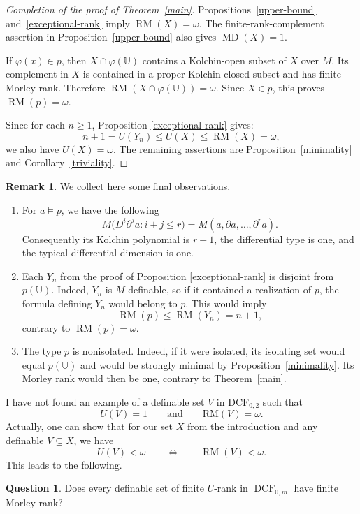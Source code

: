 \documentclass[11pt,a4paper]{amsart}
\theoremstyle{definition}
\newtheorem{remark}[theorem]{Remark}
\newtheorem{question}[theorem]{Question}
\newcommand{\DCF}{\operatorname{DCF}}
\newcommand{\RM}{\operatorname{RM}}
\newcommand{\MD}{\operatorname{MD}}
\newcommand{\Ucal}{{\mathds{U}}}
\begin{document}
\begin{proof}[Completion of the proof of Theorem~\ref{main}]
Propositions~\ref{upper-bound} and~\ref{exceptional-rank} imply
$\RM(X)=\omega$. The finite-rank-complement assertion in
Proposition~\ref{upper-bound} also gives $\MD(X)=1$.

If $\varphi(x)\in p$, then $X\cap\varphi(\Ucal)$ contains a
Kolchin-open subset of $X$ over $M$. Its complement in $X$ is contained
in a proper Kolchin-closed subset and has finite Morley rank.
Therefore $\RM(X\cap\varphi(\Ucal))=\omega$. Since $X\in p$,
this proves $\RM(p)=\omega$.

Since for each $n\geqslant1$, Proposition \ref{exceptional-rank} gives:
\[
n+1=U(Y_n)\leqslant U(X)\leqslant\RM(X)=\omega,
\]
we also have $U(X)=\omega$. The remaining assertions are Proposition~\ref{minimality} and
Corollary~\ref{triviality}.
\end{proof}

\begin{remark}
We collect here some final observations.
\begin{enumerate}
  \item For $a\models p$, we have the following
\[
 M\bigl(D^i\partial^j a:i+j\leqslant r\bigr)
   =M(a,\partial a,\ldots,\partial^r a).
\]
Consequently its Kolchin polynomial is $r+1$, the differential type is
one, and the typical differential dimension is one.

  \item Each $Y_n$ from the proof of Proposition \ref{exceptional-rank} is disjoint from $p(\Ucal)$. Indeed, $Y_n$ is
$M$-definable, so if it contained a realization of $p$,
the formula defining $Y_n$ would belong to $p$. This would
imply
\[
\RM(p)\leqslant\RM(Y_n)=n+1,
\]
contrary to $\RM(p)=\omega$.

  \item The type $p$ is nonisolated. Indeed, if it were isolated, its isolating
set would equal $p(\Ucal)$ and would be strongly minimal by
Proposition~\ref{minimality}. Its Morley rank would then be one,
contrary to Theorem~\ref{main}.
\end{enumerate}

\end{remark}
I have not found an example of a definable set $V$ in
$\mathrm{DCF}_{0,2}$ such that
\[
U(V)=1
\qquad\text{and}\qquad
\mathrm{RM}(V)=\omega.
\]
Actually, one can show that for our set $X$ from the introduction and any definable $V\subseteq X$, we have
\[
U(V)<\omega\qquad\iff\qquad\RM(V)<\omega.
\]
This leads to the following.
\begin{question}
Does every definable set of finite
$U$-rank in $\DCF_{0,m}$ have finite Morley rank?
\end{question}
\end{document}
